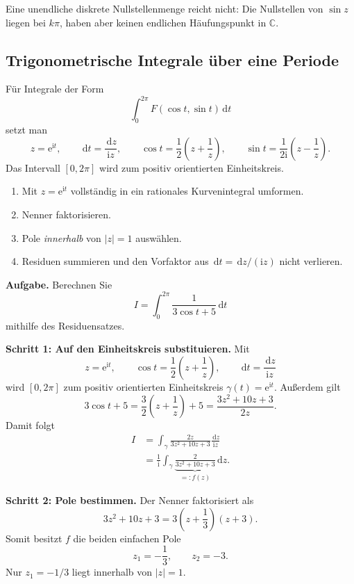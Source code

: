 \documentclass[11pt,a4paper]{article}
\newcommand{\C}{\mathbb C}
\newcommand{\ii}{\mathrm i}
\newcommand{\ee}{\mathrm e}
\newcommand{\dd}{\,\mathrm d}
\newcommand{\1}{\mathbf 1}
\begin{document}
{Eine unendliche diskrete Nullstellenmenge reicht nicht: Die Nullstellen von $\sin z$
liegen bei $k\pi$, haben aber keinen endlichen Häufungspunkt in $\C$.

\subsection{Trigonometrische Integrale über eine Periode}
Für Integrale der Form
\[
\int_0^{2\pi}F(\cos t,\sin t)\dd t
\]
setzt man
\[
z=\ee^{\ii t},\qquad
\dd t=\frac{\dd z}{\ii z},\qquad
\cos t=\frac12\left(z+\frac1z\right),\qquad
\sin t=\frac1{2\ii}\left(z-\frac1z\right).
\]
Das Intervall $[0,2\pi]$ wird zum positiv orientierten Einheitskreis.

\begin{kochrezeptbox}[title=Trigonometrisches Integral]
\begin{enumerate}
\item Mit $z=\ee^{\ii t}$ vollständig in ein rationales Kurvenintegral umformen.
\item Nenner faktorisieren.
\item Pole \emph{innerhalb} von $|z|=1$ auswählen.
\item Residuen summieren und den Vorfaktor aus $\dd t=\dd z/(\ii z)$ nicht verlieren.
\end{enumerate}
\end{kochrezeptbox}

\begin{beispielbox}[title={Vorgerechnetes Prüfungsbeispiel: Aufgabe 9 (2024) -- trigonometrisches Integral}]
\textbf{Aufgabe.} Berechnen Sie
\[
I=\int_0^{2\pi}\frac{1}{3\cos t+5}\dd t
\]
mithilfe des Residuensatzes.

\textbf{Schritt 1: Auf den Einheitskreis substituieren.}
Mit
\[
z=\ee^{\ii t},\qquad
\cos t=\frac12\left(z+\frac1z\right),\qquad
\dd t=\frac{\dd z}{\ii z}
\]
wird $[0,2\pi]$ zum positiv orientierten Einheitskreis
$\gamma(t)=\ee^{\ii t}$. Außerdem gilt
\[
3\cos t+5
=\frac32\left(z+\frac1z\right)+5
=\frac{3z^2+10z+3}{2z}.
\]
Damit folgt
\[
\begin{aligned}
I
&=\int_\gamma
\frac{2z}{3z^2+10z+3}\frac{\dd z}{\ii z}\\
&=\frac1{\ii}\int_\gamma
\underbrace{\frac{2}{3z^2+10z+3}}_{=:f(z)}\dd z.
\end{aligned}
\]

\textbf{Schritt 2: Pole bestimmen.}
Der Nenner faktorisiert als
\[
3z^2+10z+3=3\left(z+\frac13\right)(z+3).
\]
Somit besitzt $f$ die beiden einfachen Pole
\[
z_1=-\frac13,\qquad z_2=-3.
\]
Nur $z_1=-1/3$ liegt innerhalb von $|z|=1$.


\end{beispielbox}}
\end{document}
